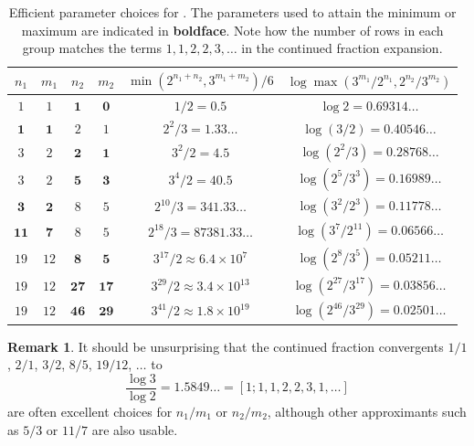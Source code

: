 \documentclass[12pt,a4paper,reqno]{amsart}
\numberwithin{equation}{section}
\theoremstyle{plain}
\theoremstyle{definition}
\newtheorem{remark}[theorem]{Remark}
\begin{document}
\begin{table}[ht]
\centering
\begin{tabular}{|c|c|c|c|c|c|}
\hline
$n_1$ & $m_1$ & $n_2$ & $m_2$ & $\min(2^{n_1+n_2},3^{m_1+m_2})/6$ & $\log \max(3^{m_1}/2^{n_1}, 2^{n_2}/3^{m_2})$ \\
\hline
$1$ & $1$ & $\mathbf{1}$ & $\mathbf{0}$ & $1/2 = 0.5$ & $\log 2 = 0.69314\dots$ \\
\hline
$\mathbf{1}$ & $\mathbf{1}$ & $2$ & $1$ & $2^2/3 = 1.33\dots$ & $\log (3/2) = 0.40546\dots$\\
\hline
$3$ & $2$ & $\mathbf{2}$ & $\mathbf{1}$ & $3^2/2 = 4.5$ & $\log (2^2/3) = 0.28768\dots$ \\
$3$ & $2$ & $\mathbf{5}$ & $\mathbf{3}$ & $3^4/2 = 40.5$ & $\log (2^5/3^3) = 0.16989\dots$ \\
\hline
$\mathbf{3}$ & $\mathbf{2}$ & $8$ & $5$ & $2^{10}/3 = 341.33\dots$ & $\log (3^2/2^3) = 0.11778\dots$\\ 
$\mathbf{11}$ & $\mathbf{7}$ & $8$ & $5$ & $2^{18}/3 = 87381.33\dots$ & $\log (3^7/2^{11}) = 0.06566\dots$ \\
\hline
$19$ & $12$ & $\mathbf{8}$ & $\mathbf{5}$ & $3^{17}/2 \approx 6.4 \times 10^7$ & $\log (2^8/3^5) = 0.05211\dots$ \\
$19$ & $12$ & $\mathbf{27}$ & $\mathbf{17}$ & $3^{29}/2 \approx 3.4 \times 10^{13}$ & $\log (2^{27}/3^{17}) = 0.03856\dots$ \\
$19$ & $12$ & $\mathbf{46}$ & $\mathbf{29}$ & $3^{41}/2 \approx 1.8 \times 10^{19} $ & $\log (2^{46}/3^{29}) = 0.02501\dots$ \\
\hline
\end{tabular}
\caption{Efficient parameter choices for .  The parameters used to attain the minimum or maximum are indicated in \textbf{boldface}. Note how the number of rows in each group matches the terms $1,1,2,2,3,\dots$ in the continued fraction expansion.}\label{approx-table}
\end{table}

\begin{remark}
It should be unsurprising that the continued fraction convergents $1/1$, $2/1$, $3/2$, $8/5$, $19/12$, $\dots$ to 
$$\frac{\log 3}{\log 2} = 1.5849\dots = [1; 1,1,2,2,3,1,\dots]$$
are often excellent choices for $n_1/m_1$ or $n_2/m_2$, although other approximants such as $5/3$ or $11/7$ are also usable.
\end{remark}
\end{document}
